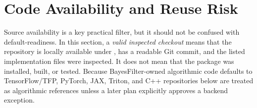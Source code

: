 \documentclass[11pt]{article}
\begin{document}
\section{Code Availability and Reuse Risk}

Source availability is a key practical filter, but it should not be confused
with default-readiness.  In this section, a \emph{valid inspected checkout}
means that the repository is locally available under
, has a readable Git commit, and the
listed implementation files were inspected.  It does not mean that the package
was installed, built, or tested.  Because BayesFilter-owned algorithmic code
defaults to TensorFlow/TFP, PyTorch, JAX, Triton, and C++ repositories below
are treated as algorithmic references unless a later plan explicitly approves a
backend exception.
\end{document}
